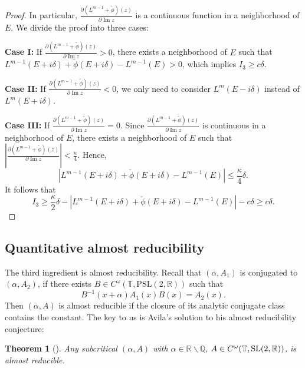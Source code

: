\documentclass[11pt]{amsart}
\newtheorem{theorem}{Theorem}[section]
\theoremstyle{remark}
\theoremstyle{definition}
\newcommand{\Q}{{\mathbf Q}}
\newcommand{\R}{{\mathbf R}}
\newcommand{\T}{{\mathbf T}}
\newcommand{\SL}{{\rm SL}}
\def\R{{\mathbb R}}
\def\Q{{\mathbb Q}}
\def\T{{\mathbb T}}
\begin{document}
\begin{proof}
In particular, \( \frac{\partial (L^{m-1} + \tilde{\phi})(z)}{\partial \operatorname{Im} z} \) is a continuous function in a neighborhood of \( E \). We divide the proof into three cases:
 
\smallskip
\textbf{Case I:} If \( \frac{\partial (L^{m-1} + \tilde{\phi})(z)}{\partial \operatorname{Im} z} > 0 \), there exists a neighborhood of \( E \) such that \( L^{m-1}(E+i\delta) + \tilde{\phi}({E+i\delta}) - L^{m-1}(E) > 0 \), which implies \( I_3 \geq c\delta \).
 
\smallskip
\textbf{Case II:} If \( \frac{\partial (L^{m-1} + \tilde{\phi})(z)}{\partial \operatorname{Im} z} < 0 \), we only need to consider \( L^{m}(E-i\delta) \) instead of \( L^{m}(E+i\delta) \).
 
\smallskip
\textbf{Case III:} If \( \frac{\partial (L^{m-1} + \tilde{\phi})(z)}{\partial \operatorname{Im} z} = 0 \). Since \( \frac{\partial (L^{m-1} + \tilde{\phi})(z)}{\partial \operatorname{Im} z} \) is continuous in a neighborhood of \( E \), there exists a neighborhood of \( E \) such that \( \left| \frac{\partial (L^{m-1} + \tilde{\phi})(z)}{\partial \operatorname{Im} z} \right| < \frac{\kappa}{4} \). Hence,
\[
\left| L^{m-1}(E+i\delta) + \tilde{\phi}(E+i\delta) - L^{m-1}(E) \right| \leq \frac{\kappa}{4}\delta.
\]
It follows that
\[
I_3 \geq \frac{\kappa}{2}\delta - \left| L^{m-1}(E+i\delta) + \tilde{\phi}(E+i\delta) - L^{m-1}(E) \right| - c\delta \geq c\delta.
\]
\end{proof}





\subsection{Quantitative almost reducibility}
The third  ingredient is almost reducibility.  Recall that $(\alpha,A_1)$ is conjugated to $(\alpha,A_2)$, if there exists $B\in C^\omega(\T,\mathrm{PSL}(2,\R))$
such that 
$$B^{-1}(x+\alpha)A_1(x)B(x)=A_2(x).$$ 
Then $(\alpha,A)$ is almost reducible if the closure of its analytic conjugate class contains the constant. The key to us is Avila's solution to his almost reducibility conjecture: 

\begin{theorem}[\cite{avila-kam,avila2010almost}] \label{arc-conjecture}
	Any subcritical $(\alpha,A)$ with $\alpha\in \R\backslash\Q$, $A\in C^\omega(\T,\SL(2,\R))$, is almost reducible.
\end{theorem}
\end{document}
